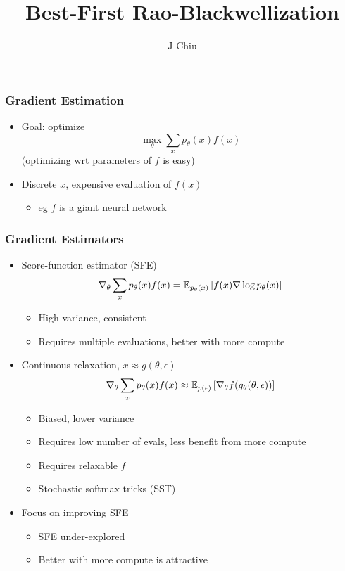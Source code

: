 \documentclass{beamer}
\title{Best-First Rao-Blackwellization}
\author{J Chiu}
\begin{document}
\begin{frame}[plain]
\titlepage
\end{frame}

\begin{frame}
\frametitle{Gradient Estimation}
\begin{itemize}
\item Goal: optimize
$$\max_\theta \sum_x p_\theta(x)f(x)$$
(optimizing wrt parameters of $f$ is easy)
\item Discrete $x$, expensive evaluation of $f(x)$
    \begin{itemize}
    \item eg $f$ is a giant neural network
    \end{itemize}
\end{itemize}
\end{frame}

\begin{frame}
\frametitle{Gradient Estimators}
\begin{itemize}
\item Score-function estimator (SFE)
    $$\nabla_\theta \sum_x p_\theta(x)f(x)
    = \mathbb{E}_{p_\theta(x)}\left[f(x)\nabla \log p_\theta(x)\right]$$
    \begin{itemize}
    \item High variance, consistent
    \item Requires multiple evaluations, better with more compute
    \end{itemize}
\item Continuous relaxation, $x \approx g(\theta, \epsilon)$
    $$\nabla_\theta \sum_x p_\theta(x)f(x)
    \approx \mathbb{E}_{p(\epsilon)}\left[\nabla_\theta f(g_\theta(\theta, \epsilon))\right]$$
    \begin{itemize}
    \item Biased, lower variance
    \item Requires low number of evals, less benefit from more compute
    \item Requires relaxable $f$
    \item Stochastic softmax tricks (SST)
    \end{itemize}
\item Focus on improving SFE
    \begin{itemize}
    \item SFE under-explored
    \item Better with more compute is attractive
    \end{itemize}
\end{itemize}
\end{frame}
\end{document}
